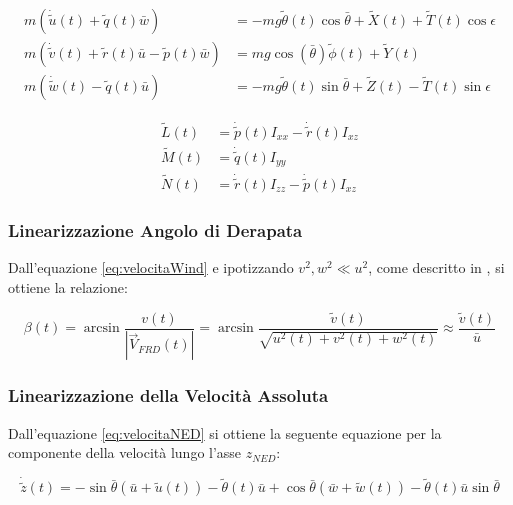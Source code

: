 \begin{equation}
    \label{eq:primaEquazioneCardinaleLineare}
    \begin{split}
        m\left(\dot{\widetilde{u}}(t) + \widetilde{q}(t)\bar{w}\right)                           & = -mg\widetilde{\theta}(t)\cos\bar{\theta} + \widetilde{X}(t) + \widetilde{T}(t)\cos\epsilon \\
        m\left(\dot{\widetilde{v}}(t) + \widetilde{r}(t)\bar{u} - \widetilde{p}(t)\bar{w}\right) & = mg\cos(\bar{\theta})\widetilde{\phi}(t) + \widetilde{Y}(t)                                 \\
        m\left(\dot{\widetilde{w}}(t) - \widetilde{q}(t)\bar{u}\right)                           & = -mg\widetilde{\theta}(t)\sin\bar{\theta} + \widetilde{Z}(t) - \widetilde{T}(t)\sin\epsilon
    \end{split}
\end{equation}

\begin{equation}
    \label{eq:secondaEquazioneCardinaleLineare}
    \begin{split}
        \widetilde{L}(t) & = \dot{\widetilde{p}}(t)I_{xx} - \dot{\widetilde{r}}(t)I_{xz} \\
        \widetilde{M}(t) & = \dot{\widetilde{q}}(t)I_{yy}                                \\
        \widetilde{N}(t) & = \dot{\widetilde{r}}(t)I_{zz} - \dot{\widetilde{p}}(t)I_{xz}
    \end{split}
\end{equation}

\subsubsection{Linearizzazione Angolo di Derapata}

Dall'equazione \eqref{eq:velocitaWind} e ipotizzando $v^2, w^2 \ll u^2$, come descritto in \cite{bryson_control_spacecraft_aircraft}, si ottiene la relazione:

\begin{equation}
    \label{eq:angoloDerapataLineare}
    \beta(t) = \arcsin \frac{v(t)}{\left|\vec{V}_{FRD}(t)\right| } = \arcsin \frac{\widetilde{v}(t)}{\sqrt{u^2(t) + v^2(t) + w^2(t)}} \approx \frac{\widetilde{v}(t)}{\bar{u}}
\end{equation}

\subsubsection{Linearizzazione della Velocità Assoluta}
Dall'equazione \eqref{eq:velocitaNED} si ottiene la seguente equazione per la componente della velocità lungo l'asse $\hat{z}_{NED}$:

\begin{equation}
    \label{eq:velocitaNEDZLineare}
    \dot{\widetilde{z}}(t) = -\sin\bar{\theta}(\bar{u} + \widetilde{u}(t)) - \widetilde{\theta}(t)\bar{u} + \cos\bar{\theta}(\bar{w} + \widetilde{w}(t)) - \widetilde{\theta}(t)\bar{u}\sin\bar{\theta}
\end{equation}
